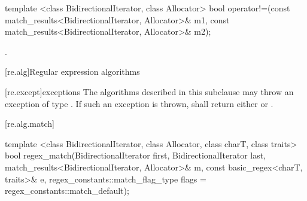 %
%
\begin{itemdecl}
template <class BidirectionalIterator, class Allocator>
bool operator!=(const match_results<BidirectionalIterator, Allocator>& m1,
                const match_results<BidirectionalIterator, Allocator>& m2);
\end{itemdecl}

\begin{itemdescr}
\pnum
\returns {}.
\end{itemdescr}

[re.alg]{Regular expression algorithms}

[re.except]{exceptions}
\pnum
The algorithms described in this subclause may throw an exception
of type . If such an exception  is thrown,
 shall return either 
or .

[re.alg.match]{}
%
\begin{itemdecl}
template <class BidirectionalIterator, class Allocator, class charT, class traits>
  bool regex_match(BidirectionalIterator first, BidirectionalIterator last,
                   match_results<BidirectionalIterator, Allocator>& m,
                   const basic_regex<charT, traits>& e,
                   regex_constants::match_flag_type flags =
                     regex_constants::match_default);
\end{itemdecl}

